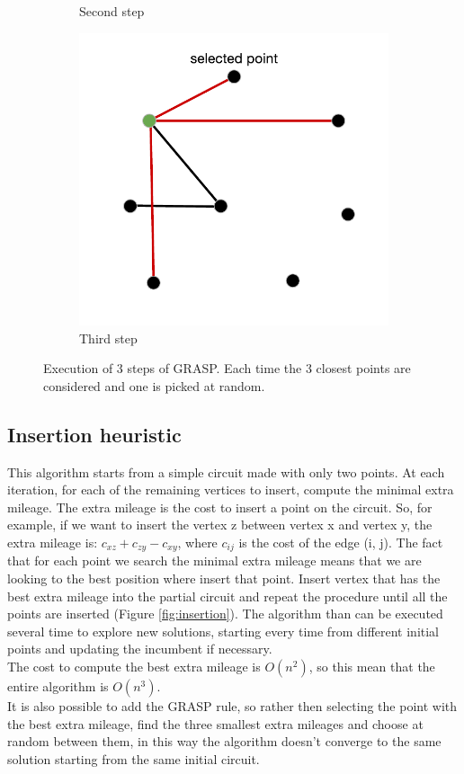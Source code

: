 \begin{figure}[h!]
\begin{subfigure}[b]{0.48\linewidth}
    \caption{Second step}
  \end{subfigure}
  \begin{subfigure}[b]{0.48\linewidth}
    \includegraphics[width=\linewidth]{media/grasp_fase3.pdf}
    \caption{Third step}
  \end{subfigure}
  \caption{Execution of 3 steps of GRASP. Each time the 3 closest points are considered and one is picked at random.}
\end{figure}

\subsection{Insertion heuristic}
\label{insertion}
This algorithm starts from a simple circuit made with only two points. At each iteration, for each of the remaining vertices to insert, compute the minimal extra mileage. The extra mileage is the cost to insert a point on the circuit. So, for example, if we want to insert the vertex z between vertex x and vertex y, the extra mileage is: $c_{xz} + c_{zy} - c_{xy}$, where $c_{ij}$ is the cost of the edge (i, j). The fact that for each point we search the minimal extra mileage means that we are looking to the best position where insert that point. Insert vertex that has the best extra mileage into the partial circuit and repeat the procedure until all the points are inserted (Figure \ref{fig:insertion}). The algorithm than can be executed several time to explore new solutions, starting every time from different initial points and updating the incumbent if necessary. \\
The cost to compute the best extra mileage is $O(n^2)$, so this mean that the entire algorithm is $O(n^3)$.\\
It is also possible to add the GRASP rule, so rather then selecting the point with the best extra mileage, find the three smallest extra mileages and choose at random between them, in this way the algorithm doesn't converge to the same solution starting from the same initial circuit. \\

